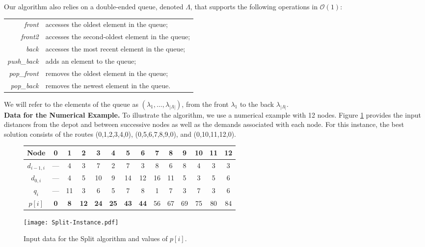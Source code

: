 \documentclass[11pt]{article}
\newcommand{\cO}{{\mathcal O}}
\begin{document}
Our algorithm also relies on a double-ended queue, denoted $\Lambda$, that supports the following operations in $\cO(1)$:

\noindent
\hspace*{1cm}
\begin{tabular}{r@{ -- }l}
\emph{front} &accesses the oldest element in the queue; \\
\emph{front2} &accesses the second-oldest element in the queue; \\
\emph{back} &accesses the most recent element in the queue; \\
\emph{push\_back} &adds an element to the queue; \\
\emph{pop\_front} &removes the oldest element in the queue; \\
\emph{pop\_back} &removes the newest element in the queue. \\
\end{tabular}

\noindent
We will refer to the elements of the queue as $(\lambda_1,\dots,\lambda_{|\Lambda|})$, from the front $\lambda_1$ to the back $\lambda_{|\Lambda|}$. \\

\noindent
\textbf{Data for the Numerical Example.}
To illustrate the algorithm, we use a numerical example with 12 nodes.
Figure \ref{figure-numericalExample} provides the input distances from the depot and between successive nodes as well as the demands associated with each node.  For this instance, the best solution consists of the routes (0,1,2,3,4,0), (0,5,6,7,8,9,0), and (0,10,11,12,0).

\begin{figure}[H]
\begin{minipage}[t]{.65\linewidth}
\renewcommand{\arraystretch}{1.12}
\setlength{\tabcolsep}{0.12cm}
\scalebox{0.9}
{
\begin{tabular}{|c|ccccccccccccc|}
\hline
\textbf{Node}&\textbf{0}&\textbf{1}&\textbf{2}&\textbf{3}&\textbf{4}&\textbf{5}&\textbf{6}&\textbf{7}&\textbf{8}&\textbf{9}&\textbf{10}&\textbf{11}&\textbf{12}\\
\hline
$d_{i-1,i}$&---&4&3&7&2&7&3&8&6&8&4&3&3\\
$d_{0,i}$&---&4&5&10&9&14&12&16&11&5&3&5&6\\
$q_i$&---&11&3&6&5&7&8&1&7&3&7&3&6\\
\hline
\hline
$p[i]$&\textbf{0}&\textbf{8}&\textbf{12}&\textbf{24}&\textbf{25}&\textbf{43}&\textbf{44}& 56 & 67& 69& 75 & 80 & 84 \\
\hline
\end{tabular}
}
\end{minipage}
\begin{minipage}[c]{.35\linewidth}
\vspace*{-0.5cm}
\texttt{[image: Split-Instance.pdf]}
\vspace*{-1cm}
\end{minipage}
\caption{Input data for the Split algorithm and values of $p[i]$.\hspace*{5cm}}
\label{figure-numericalExample}
\end{figure}
\end{document}
